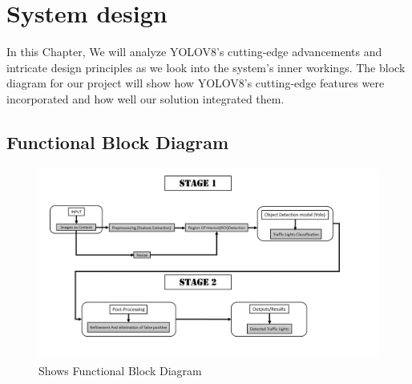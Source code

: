 \documentclass[12 pt]{report}
\begin{document}
\newpage
\chapter{System design}
\justify
In this Chapter, We will analyze YOLOV8's cutting-edge advancements and intricate design principles as we look into the system's inner workings. The block diagram for our project will show how YOLOV8's cutting-edge features were incorporated and how well our solution integrated them.

\section{Functional Block Diagram}
\begin{figure}[h]
  \centering
  \includegraphics[width=1.08\textwidth]{Fun-Diagram.png}
  \caption{Shows Functional Block Diagram}
  \label{fig:function_block_diagram}
\end{figure}
\end{document}
